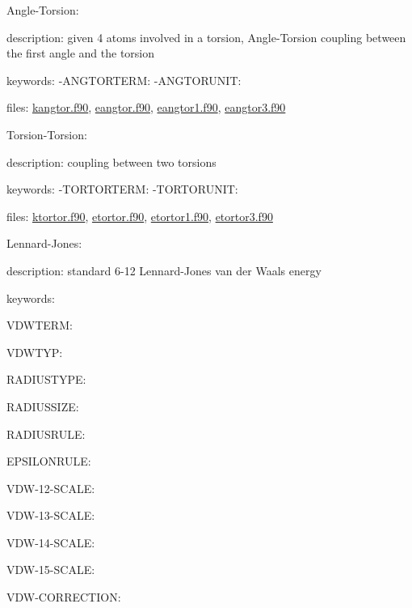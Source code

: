 \begin{DoxyItemize}
\begin{DoxyItemize}
\end{DoxyItemize}
\item Angle-\/\-Torsion\-:
\begin{DoxyItemize}
\item description\-: given 4 atoms involved in a torsion, Angle-\/\-Torsion coupling between the first angle and the torsion
\item keywords\-: -\/\-A\-N\-G\-T\-O\-R\-T\-E\-R\-M\-: -\/\-A\-N\-G\-T\-O\-R\-U\-N\-I\-T\-:
\item files\-: \hyperlink{kangtor_8f90}{kangtor.\-f90}, \hyperlink{eangtor_8f90}{eangtor.\-f90}, \hyperlink{eangtor1_8f90}{eangtor1.\-f90}, \hyperlink{eangtor3_8f90}{eangtor3.\-f90}
\end{DoxyItemize}
\item Torsion-\/\-Torsion\-:
\begin{DoxyItemize}
\item description\-: coupling between two torsions
\item keywords\-: -\/\-T\-O\-R\-T\-O\-R\-T\-E\-R\-M\-: -\/\-T\-O\-R\-T\-O\-R\-U\-N\-I\-T\-:
\item files\-: \hyperlink{ktortor_8f90}{ktortor.\-f90}, \hyperlink{etortor_8f90}{etortor.\-f90}, \hyperlink{etortor1_8f90}{etortor1.\-f90}, \hyperlink{etortor3_8f90}{etortor3.\-f90}
\end{DoxyItemize}
\item Lennard-\/\-Jones\-:
\begin{DoxyItemize}
\item description\-: standard 6-\/12 Lennard-\/\-Jones van der Waals energy
\item keywords\-:
\begin{DoxyItemize}
\item V\-D\-W\-T\-E\-R\-M\-:
\item V\-D\-W\-T\-Y\-P\-:
\item R\-A\-D\-I\-U\-S\-T\-Y\-P\-E\-:
\item R\-A\-D\-I\-U\-S\-S\-I\-Z\-E\-:
\item R\-A\-D\-I\-U\-S\-R\-U\-L\-E\-:
\item E\-P\-S\-I\-L\-O\-N\-R\-U\-L\-E\-:
\item V\-D\-W-\/12-\/\-S\-C\-A\-L\-E\-:
\item V\-D\-W-\/13-\/\-S\-C\-A\-L\-E\-:
\item V\-D\-W-\/14-\/\-S\-C\-A\-L\-E\-:
\item V\-D\-W-\/15-\/\-S\-C\-A\-L\-E\-:
\item V\-D\-W-\/\-C\-O\-R\-R\-E\-C\-T\-I\-O\-N\-:
\end{DoxyItemize}
\end{DoxyItemize}
\end{DoxyItemize}

